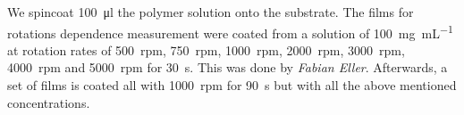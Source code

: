 
We spincoat \SI{100}{\micro\litre}  the polymer solution onto the substrate.
The films for rotations dependence measurement were coated from a solution of \SI{100}{\milli\gram\per\milli\liter} at rotation rates of
\SI{500}{rpm}, \SI{750}{rpm}, \SI{1000}{rpm}, \SI{2000}{rpm}, \SI{3000}{rpm}, \SI{4000}{rpm} and \SI{5000}{rpm} for \SI{30}{\second}. This was done by \textit{Fabian Eller}.
Afterwards, a set of films is coated all with \SI{1000}{rpm} for \SI[]{90}{\second} but with all the above mentioned concentrations.